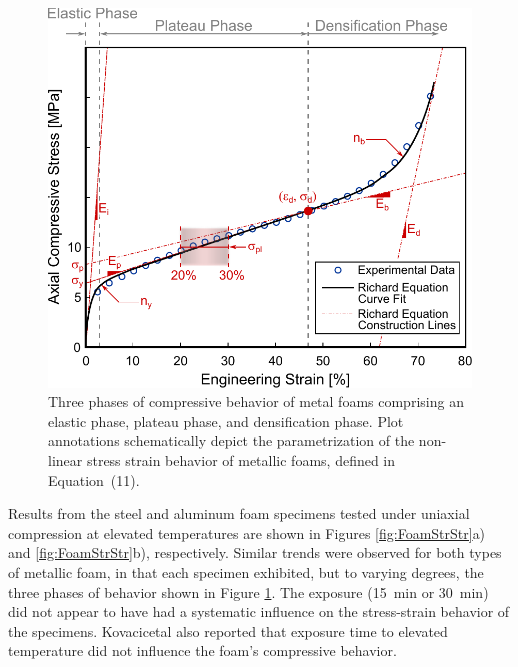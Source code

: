 \documentclass[review]{elsarticle}
\begin{document}
\begin{figure}[htbp]
	\begin{center}
		\includegraphics[width=0.75\linewidth]{Tex-Figures/Fig07.pdf}
		\caption{Three phases of compressive behavior of metal foams comprising an elastic phase, plateau phase, and densification phase. Plot annotations schematically depict the parametrization of the non-linear stress strain behavior of metallic foams, defined in Equation~(11).}
		\label{fig:MetFoaBeh}
	\end{center}
\end{figure}

Results from the steel and aluminum foam specimens tested under uniaxial compression at elevated temperatures are shown in Figures \ref{fig:FoamStrStr}a) and \ref{fig:FoamStrStr}b), respectively. Similar trends were observed for both types of metallic foam, in that each specimen exhibited, but to varying degrees, the three phases of behavior shown in Figure \ref{fig:MetFoaBeh}. The exposure (15~min or 30~min) did not appear to have had a systematic influence on the stress-strain behavior of the specimens. Kovacicetal \cite{Kovacicetal2016} also reported that exposure time to elevated temperature did not influence the foam's compressive behavior.
\end{document}

